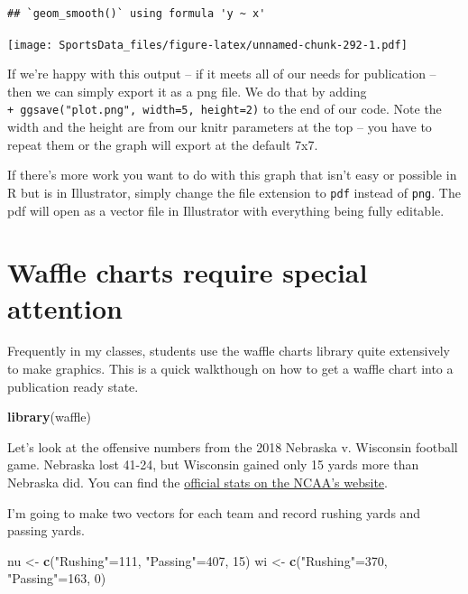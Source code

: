 \documentclass[
]{book}
\newenvironment{Shaded}{\begin{snugshade}}{\end{snugshade}}
\newcommand{\DecValTok}[1]{\textcolor[rgb]{0.00,0.00,0.81}{#1}}
\newcommand{\KeywordTok}[1]{\textcolor[rgb]{0.13,0.29,0.53}{\textbf{#1}}}
\newcommand{\NormalTok}[1]{#1}
\newcommand{\StringTok}[1]{\textcolor[rgb]{0.31,0.60,0.02}{#1}}
\begin{document}
\begin{verbatim}
## `geom_smooth()` using formula 'y ~ x'
\end{verbatim}

\texttt{[image: SportsData\_files/figure-latex/unnamed-chunk-292-1.pdf]}

If we're happy with this output -- if it meets all of our needs for publication -- then we can simply export it as a png file. We do that by adding \texttt{+\ ggsave("plot.png",\ width=5,\ height=2)} to the end of our code. Note the width and the height are from our knitr parameters at the top -- you have to repeat them or the graph will export at the default 7x7.

If there's more work you want to do with this graph that isn't easy or possible in R but is in Illustrator, simply change the file extension to \texttt{pdf} instead of \texttt{png}. The pdf will open as a vector file in Illustrator with everything being fully editable.

\hypertarget{waffle-charts-require-special-attention}{%
\section{Waffle charts require special attention}\label{waffle-charts-require-special-attention}}

Frequently in my classes, students use the waffle charts library quite extensively to make graphics. This is a quick walkthough on how to get a waffle chart into a publication ready state.

\begin{Shaded}
\begin{Highlighting}[]
\KeywordTok{library}\NormalTok{(waffle)}
\end{Highlighting}
\end{Shaded}

Let's look at the offensive numbers from the 2018 Nebraska v. Wisconsin football game. Nebraska lost 41-24, but Wisconsin gained only 15 yards more than Nebraska did. You can find the \href{https://www.ncaa.com/game/football/fbs/2018/10/06/nebraska-wisconsin/team-stats}{official stats on the NCAA's website}.

I'm going to make two vectors for each team and record rushing yards and passing yards.

\begin{Shaded}
\begin{Highlighting}[]
\NormalTok{nu <-}\StringTok{ }\KeywordTok{c}\NormalTok{(}\StringTok{"Rushing"}\NormalTok{=}\DecValTok{111}\NormalTok{, }\StringTok{"Passing"}\NormalTok{=}\DecValTok{407}\NormalTok{, }\DecValTok{15}\NormalTok{)}
\NormalTok{wi <-}\StringTok{ }\KeywordTok{c}\NormalTok{(}\StringTok{"Rushing"}\NormalTok{=}\DecValTok{370}\NormalTok{, }\StringTok{"Passing"}\NormalTok{=}\DecValTok{163}\NormalTok{, }\DecValTok{0}\NormalTok{)}
\end{Highlighting}
\end{Shaded}
\end{document}
